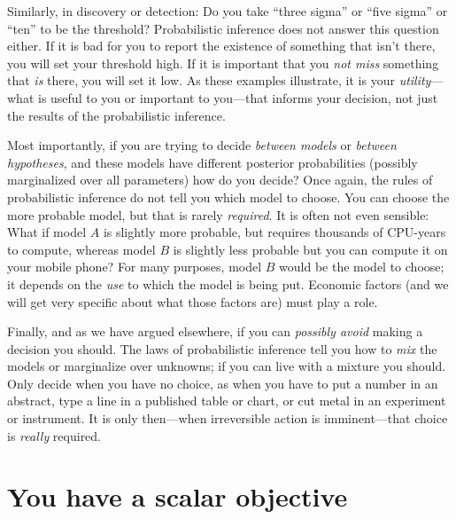 \documentclass[12pt,twoside,pdftex]{article}
\begin{document}
Similarly, in discovery or detection: Do you take ``three sigma'' or
``five sigma'' or ``ten'' to be the threshold?  Probabilistic
inference does not answer this question either. If it is bad for you to report the
existence of something that isn't there, you will set your threshold
high.  If it is important that you \emph{not miss} something that
\emph{is} there, you will set it low.  As these examples illustrate,
it is your \emph{utility}---what is useful to you or important to
you---that informs your decision, not just the results of the
probabilistic inference.

Most importantly, if you are trying to decide \emph{between models} or
\emph{between hypotheses}, and these models have different posterior
probabilities (possibly marginalized over all parameters) how do you
decide?  Once again, the rules of probabilistic inference do not tell
you which model to choose.  You can choose the
more probable model, but that is rarely \emph{required}.  It is often
not even sensible: What if model $A$ is slightly more probable, but
requires thousands of CPU-years to compute, whereas model $B$ is
slightly less probable but you can compute it on your mobile phone?
For many purposes, model $B$ would be the model to choose; it depends
on the \emph{use} to which the model is being put.  Economic factors
(and we will get very specific about what those factors are) must play
a role.

Finally, and as we have argued elsewhere, if you can
\emph{possibly avoid} making a decision you should.  The laws of
probabilistic inference tell you how to \emph{mix} the models or
marginalize over unknowns; if you can live with a mixture you should.
Only decide when you have no choice, as when you have to put a number
in an abstract, type a line in a published table or chart, or cut
metal in an experiment or instrument.  It is only then---when
irreversible action is imminent---that choice is \emph{really}
required.

\section{You have a scalar objective}
\end{document}

